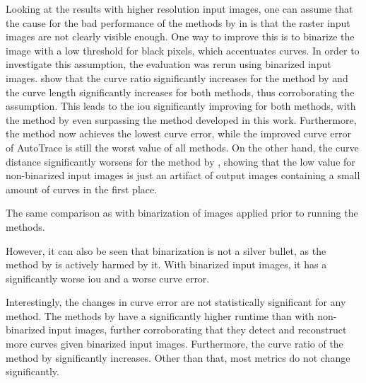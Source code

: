 Looking at the results with higher resolution input images, one can assume that the cause for the bad performance of the methods by \citet{autotrace,Puhachov2021KeypointPolyvector} in  is that the raster input images are not clearly visible enough. One way to improve this is to binarize the image with a low threshold for black pixels, which accentuates curves. In order to investigate this assumption, the evaluation was rerun using binarized input images.  show that the curve ratio significantly increases for the method by \citet{Puhachov2021KeypointPolyvector} and the curve length significantly increases for both methods, thus corroborating the assumption. This leads to the \gls{iou} significantly improving for both methods, with the method by \citet{Puhachov2021KeypointPolyvector} even surpassing the method developed in this work. Furthermore, the method now achieves the lowest curve error, while the improved curve error of AutoTrace \citep{autotrace} is still the worst value of all methods. On the other hand, the curve distance significantly worsens for the method by \citet{Puhachov2021KeypointPolyvector}, showing that the low value for non-binarized input images is just an artifact of output images containing a small amount of curves in the first place.

\begin{table}[h]
    \centering
    
    \caption{The same comparison as  with binarization of images applied prior to running the methods.}
    \label{tab:tonari-True-512-0.512}
\end{table}

However, it can also be seen that binarization is not a silver bullet, as the method by \citet{DBLP:conf/eccv/EgiazarianVAVST20} is actively harmed by it. With binarized input images, it has a significantly worse \gls{iou} and a worse curve error.

Interestingly, the changes in curve error are not statistically significant for any method. The methods by \citet{autotrace,Puhachov2021KeypointPolyvector} have a significantly higher runtime than with non-binarized input images, further corroborating that they detect and reconstruct more  curves given binarized input images. Furthermore, the curve ratio of the method by \citet{mo2021virtualsketching} significantly increases. Other than that, most metrics do not change significantly.

